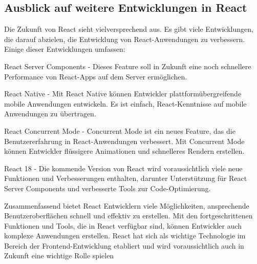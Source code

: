 \subsection{Ausblick auf weitere Entwicklungen in React}
Die Zukunft von React sieht vielversprechend aus. Es gibt viele Entwicklungen, die darauf abzielen, die Entwicklung von React-Anwendungen zu verbessern. Einige dieser Entwicklungen umfassen:

React Server Components - Dieses Feature soll in Zukunft eine noch schnellere Performance von React-Apps auf dem Server ermöglichen.

React Native - Mit React Native können Entwickler plattformübergreifende mobile Anwendungen entwickeln. Es ist einfach, React-Kenntnisse auf mobile Anwendungen zu übertragen.

React Concurrent Mode - Concurrent Mode ist ein neues Feature, das die Benutzererfahrung in React-Anwendungen verbessert. Mit Concurrent Mode können Entwickler flüssigere Animationen und schnelleres Rendern erstellen.

React 18 - Die kommende Version von React wird voraussichtlich viele neue Funktionen und Verbesserungen enthalten, darunter Unterstützung für React Server Components und verbesserte Tools zur Code-Optimierung.

Zusammenfassend bietet React Entwicklern viele Möglichkeiten, ansprechende Benutzeroberflächen schnell und effektiv zu erstellen. Mit den fortgeschrittenen Funktionen und Tools, die in React verfügbar sind, können Entwickler auch komplexe Anwendungen erstellen. React hat sich als wichtige Technologie im Bereich der Frontend-Entwicklung etabliert und wird voraussichtlich auch in Zukunft eine wichtige Rolle spielen
